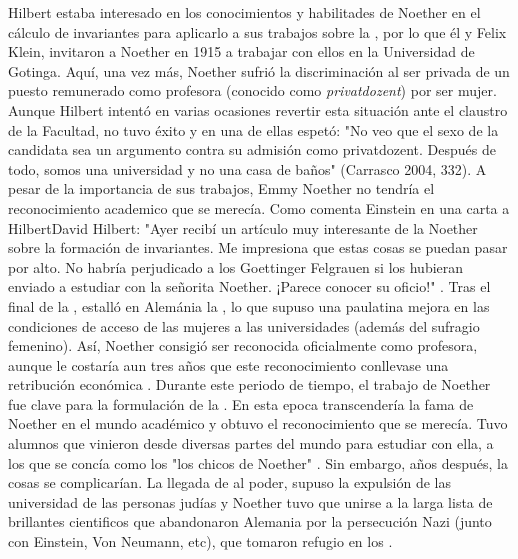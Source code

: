 Hilbert estaba interesado en los conocimientos y habilitades de Noether en el cálculo de invariantes para aplicarlo a sus trabajos sobre la ,
por lo que él y Felix Klein, invitaron a Noether en 1915 a trabajar con ellos en la Universidad de Gotinga. 
Aquí, una vez más, Noether sufrió la discriminación al ser privada de un puesto remunerado como profesora (conocido como \textit{privatdozent}) por ser mujer.
Aunque Hilbert intentó en varias ocasiones revertir esta situación ante el claustro de la Facultad, no tuvo éxito y en una de ellas espetó: "No veo que el sexo de la candidata sea un argumento contra su admisión como privatdozent. Después de todo, somos una universidad y no una casa de baños" (Carrasco 2004, 332).
A pesar de la importancia de sus trabajos, Emmy Noether no tendría el reconocimiento academico que se merecía. Como comenta Einstein en una carta a {Hilbert}{David Hilbert}: "Ayer recibí un artículo muy interesante de la Noether sobre la formación de invariantes. Me impresiona que estas cosas se puedan pasar por alto. No habría perjudicado a los Goettinger Felgrauen si los hubieran enviado a estudiar con la señorita Noether. ¡Parece conocer su oficio!" \cite{Kimberling}.
Tras el final de la , estalló en Alemánia la , lo que supuso una paulatina mejora en las condiciones de acceso de las mujeres a las universidades (además del sufragio femenino).
Así, Noether consigió ser reconocida oficialmente como profesora, aunque le costaría aun tres años que este reconocimiento conllevase una retribución económica \cite[333]{Carrasco}.
Durante este periodo de tiempo, el trabajo de Noether fue clave para la formulación de la  \cite{Weyl}.
En esta epoca transcendería la fama de Noether en el mundo académico y obtuvo el reconocimiento que se merecía. Tuvo alumnos que vinieron desde diversas partes del mundo para estudiar con ella, a los que se concía como los "los chicos de Noether" \cite{Carrasco}.
Sin embargo, años después, la cosas se complicarían.
La llegada de  al poder, supuso la expulsión de las universidad de las personas judías y Noether tuvo que unirse a la larga lista de brillantes cientificos que abandonaron Alemania por la persecución Nazi (junto con Einstein, Von Neumann, etc), que tomaron refugio en los  \cite{Kimberling}.
